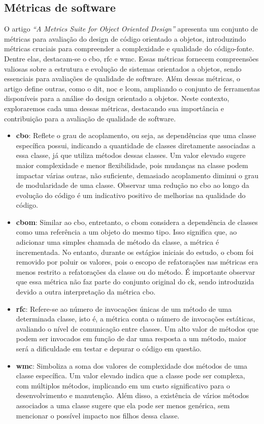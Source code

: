 \subsection{Métricas de software}
O artigo \textit{``A Metrics Suite for Object Oriented Design''} \cite{MetricsSuite} apresenta um conjunto de métricas para avaliação do design de código orientado a objetos, introduzindo métricas cruciais para compreender a complexidade e qualidade do código-fonte. Dentre elas, destacam-se o \gls{cbo}, \gls{rfc} e \gls{wmc}. Essas métricas fornecem compreensões valiosas sobre a estrutura e evolução de sistemas orientados a objetos, sendo essenciais para avaliações de qualidade de software. Além dessas métricas, o artigo define outras, como o \gls{dit}, \gls{noc} e \gls{lcom}, ampliando o conjunto de ferramentas disponíveis para a análise do design orientado a objetos. Neste contexto, exploraremos cada uma dessas métricas, destacando sua importância e contribuição para a avaliação de qualidade de software.

\begin{itemize}
    \item \textbf{\gls{cbo}}: Reflete o grau de acoplamento, ou seja, as dependências que uma classe específica possui, indicando a quantidade de classes diretamente associadas a essa classe, já que utiliza métodos dessas classes. Um valor elevado sugere maior complexidade e menor flexibilidade, pois mudanças na classe podem impactar várias outras, não suficiente, demasiado acoplamento diminui o grau de modularidade de uma classe. Observar uma redução no \gls{cbo} ao longo da evolução do código é um indicativo positivo de melhorias na qualidade do código.
    \item \textbf{\gls{cbom}}: Similar ao \gls{cbo}, entretanto, o \gls{cbom} considera a dependência de classes como uma referência a um objeto do mesmo tipo. Isso significa que, ao adicionar uma simples chamada de método da classe, a métrica é incrementada. No entanto, durante os estágios iniciais do estudo, o \gls{cbom} foi removido por poluir os valores, pois o escopo de refatorações nas métricas era menos restrito a refatorações da classe ou do método. É importante observar que essa métrica não faz parte do conjunto original do \gls{ck}, sendo introduzida devido a outra interpretação da métrica \gls{cbo}.
    \item \textbf{\gls{rfc}}: Refere-se ao número de invocações únicas de um método de uma determinada classe, isto é, a métrica conta o número de invocações estáticas, avaliando o nível de comunicação entre classes. Um alto valor de métodos que podem ser invocados em função de dar uma resposta a um método, maior será a dificuldade em testar e depurar o código em questão.
    \item \textbf{\gls{wmc}}: Simboliza a soma dos valores de complexidade dos métodos de uma classe específica. Um valor elevado indica que a classe pode ser complexa, com múltiplos métodos, implicando em um custo significativo para o desenvolvimento e manutenção. Além disso, a existência de vários métodos associados a uma classe sugere que ela pode ser menos genérica, sem mencionar o possível impacto nos filhos dessa classe.
\end{itemize}
